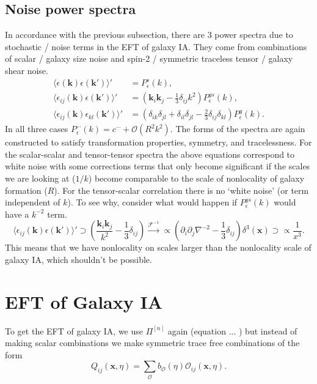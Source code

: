 \documentclass[11pt]{article}
\newcommand{\br}[1]{\ensuremath{\left( #1 \right)}}
\begin{document}
\subsection{Noise power spectra}
\label{subsec:noisepowerspectragalaxyIA}
In accordance with the previous subsection, there are 3 power spectra due to stochastic / noise terms in the EFT of galaxy IA. They come from combinations of scalar / galaxy size noise and spin-2 / symmetric traceless tensor / galaxy shear noise.
\begin{align}
    \langle \epsilon(\mathbf k)\epsilon(\mathbf k') \rangle' &= P^s_\epsilon(k), \\
    \langle \epsilon_{ij}(\mathbf k)\epsilon(\mathbf k') \rangle' &= (\mathbf k_i \mathbf k_j - \frac{1}{3} \delta_{ij}k^2)P^{gs}_\epsilon(k), \\
    \langle \epsilon_{ij}(\mathbf k)\epsilon_{kl}(\mathbf k') \rangle' &= (\delta_{ik}\delta_{jl}+\delta_{il}\delta_{jl}-\frac{2}{3}\delta_{ij}\delta_{kl})P^g_\epsilon(k) .
\end{align}
In all three cases $P_{\epsilon}^{\cdots}(k) = c^{\cdots} + \mathcal O(R^2k^2)$. The forms of the spectra are again constructed to satisfy transformation properties, symmetry, and tracelessness. For the scalar-scalar and tensor-tensor spectra the above equations correspond to white noise with some corrections terms that only become significant if the scales we are looking at ($1/k$) become comparable to the scale of nonlocality of galaxy formation ($R$). For the tensor-scalar correlation there is no `white noise' (or term independent of $k$). To see why, consider what would happen if $P^{gs}_\epsilon(k)$ would have a $k^{-2}$ term.
\begin{equation}
    \langle \epsilon_{ij}(\mathbf k)\epsilon(\mathbf k') \rangle' \supset \br{ \frac{\mathbf k_i\mathbf k_j}{k^2} - \frac{1}{3}\delta_{ij}} \xrightarrow{\mathcal F^{-1}}\propto (\partial_i\partial_j\nabla^{-2} - \frac{1}{3}\delta_{ij})\delta^{3}(\mathbf x) \supset \propto \frac{1}{x^3}.
\end{equation}
This means that we have nonlocality on scales larger than the nonlocality scale of galaxy IA, which shouldn't be possible.





\section{EFT of Galaxy IA}
To get the EFT of galaxy IA, we use $\Pi^{[n]}$ again (equation ... %
) but instead of making scalar combinations we make symmetric trace free combinations of the form
\begin{equation}
    Q_{ij}(\mathbf x, \eta) = \sum_{\mathcal O}b_{\mathcal O}(\eta)\mathcal O_{ij}(\mathbf x, \eta).
\end{equation}
\end{document}

